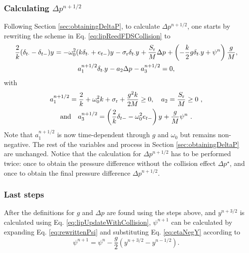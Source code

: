\subsubsection{Calculating $\Delta p^{n+1/2}$}
Following Section \ref{sec:obtainingDeltaP}, to calculate $\Delta p^{n+1/2}$, one starts by rewriting the scheme in Eq. \eqref{eq:lipReedFDSCollision} to
\begin{gather*}
    \frac{2}{k} (\delta_{t\cdot} - \delta_{t-})y^{} = -\omega_0^2(k\delta_{t\cdot} + e_{t-})y^{} - \sigma_\text{r}\delta_{t\cdot} y^{} + \frac{S_\text{r}}{M}\Delta p^{} + \left(-\frac{k}{2}g\delta_{t\cdot}y+\psi^n\right)\frac{g}{M},\\
    a_1^{n+1/2}\delta_{t\cdot}y^{} - a_2\Delta p^{} - a_3^{n+1/2} = 0,
\end{gather*}
with 
\begin{equation*}
    \begin{gathered}
    a_1^{n+1/2} = \frac{2}{k} + \omega_0^2k + \sigma_\text{r} + \frac{g^2k}{2M} \geq 0, \quad a_2 = \frac{S_\text{r}}{M} \geq 0\ , \\
     \text{and} \quad a_3^{n+1/2} = \left(\frac{2}{k} \delta_{t-} - \omega_0^2e_{t-}\right)y^{} + \frac{g}{M}\psi^n\ .
    \end{gathered}
\end{equation*}
Note that $a_1^{n+1/2}$ is now time-dependent through $g$ and $\omega_0$ but remains non-negative. The rest of the variables and process in Section \ref{sec:obtainingDeltaP} are unchanged. Notice that the calculation for $\Delta p^{n+1/2}$ has to be performed twice: once to obtain the pressure difference without the collision effect $\Delta p^\star$, and once to obtain the final pressure difference $\Delta p^{n+1/2}$.

\subsubsection{Last steps}
After the definitions for $g$ and $\Delta p$ are found using the steps above, and $y^{n+3/2}$ is calculated using Eq. \eqref{eq:lipUpdateWithCollision}, $\psi^{n+1}$ can be calculated by expanding Eq. \eqref{eq:rewrittenPsi} and substituting Eq. \eqref{eq:etaNegY} according to
\begin{equation}\label{eq:psiUpdate}
    \psi^{n+1} = \psi^n - \frac{g}{2}\left(y^{n+3/2} - y^{n-1/2}\right).
\end{equation}

